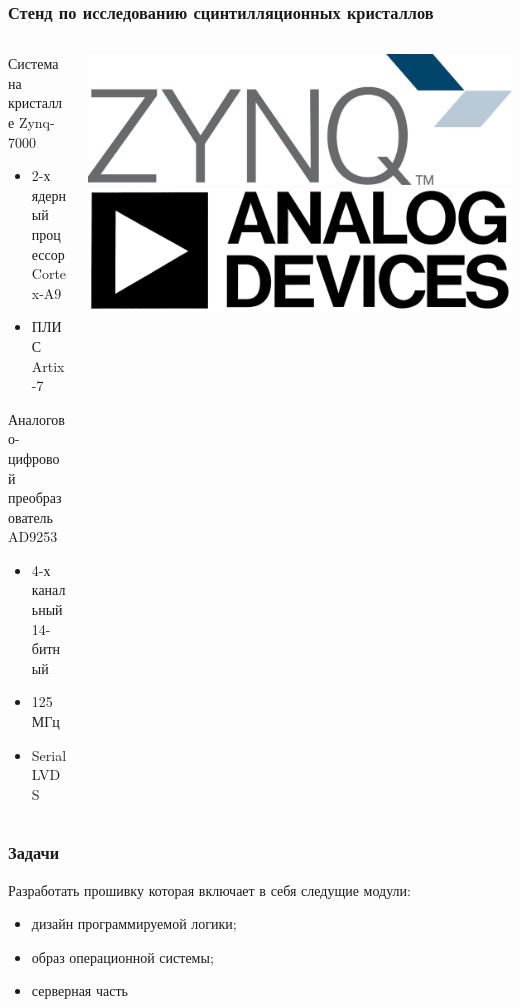 \documentclass[aspectratio=169]{beamer}
\begin{document}
\begin{frame}
\frametitle{Стенд по исследованию сцинтилляционных кристаллов}
    \begin{columns}
        \begin{column}{0.7\textwidth}
        Система на кристалле Zynq-7000
            \begin{itemize}
                \item 2-х ядерный процессор Cortex-A9
                \item ПЛИС Artix-7
            \end{itemize}
        Аналогово-цифровой преобразователь AD9253
            \begin{itemize}
                \item 4-х канальный 14-битный
                \item 125 МГц
                \item Serial LVDS
            \end{itemize}
        \end{column}
        \begin{column}{0.3\textwidth}
            \includegraphics[width=\textwidth]{Zynq.jpg}
            \includegraphics[width=\textwidth]{Analog_devices.jpg}
        \end{column}
    \end{columns}
\end{frame}

\begin{frame}
\frametitle{Задачи}
    Разработать прошивку которая включает в себя следущие модули:
    \begin{itemize}
        \item дизайн программируемой логики; 
        \item образ операционной системы;
        \item серверная часть
    \end{itemize}
\end{frame}
\end{document}
